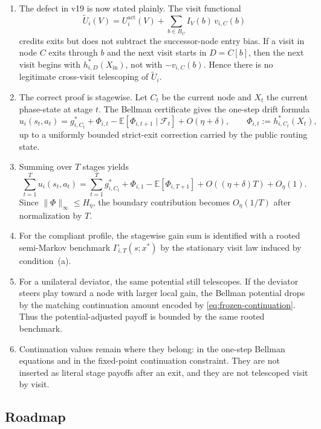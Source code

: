 \documentclass[12pt]{article}
\theoremstyle{definition}
\newcommand{\E}{\mathbb{E}}
\newcommand{\1}{\mathbf{1}}
\newcommand{\cF}{\mathcal{F}}
\begin{document}
\begin{enumerate}[label=\textnormal{(\arabic*)},leftmargin=2.4em]
\item The defect in v19 is now stated plainly. The visit functional
\[
\widetilde U_i(V)=U_i^{\mathrm{act}}(V)+\sum_{b\in B_C}I_V(b)\,v_{i,C}(b)
\]
credits exits but does not subtract the successor-node entry bias. If a visit in
node $C$ exits through $b$ and the next visit starts in $D=C[b]$, then the next
visit begins with $h_{i,D}^*(X_{\mathrm{in}})$, not with $-v_{i,C}(b)$. Hence
there is no legitimate cross-visit telescoping of $\widetilde U_i$.

\item The correct proof is stagewise. Let $C_t$ be the current node and $X_t$ the
current phase-state at stage $t$. The Bellman certificate gives the one-step
drift formula
\[
u_i(s_t,a_t)
=
g_{i,C_t}^*
+
\Phi_{i,t}
-
\E[\Phi_{i,t+1}\mid \cF_t]
+
O(\eta+\delta),
\qquad
\Phi_{i,t}:=h_{i,C_t}^*(X_t),
\]
up to a uniformly bounded strict-exit correction carried by the public routing
state.

\item Summing over $T$ stages yields
\[
\sum_{t=1}^T u_i(s_t,a_t)
=
\sum_{t=1}^T g_{i,C_t}^*
+
\Phi_{i,1}
-
\E[\Phi_{i,T+1}]
+
O\!\left((\eta+\delta)T\right)
+
O_\eta(1).
\]
Since $\|\Phi\|_\infty\le H_\eta$, the boundary contribution becomes
$O_\eta(1/T)$ after normalization by $T$.

\item For the compliant profile, the stagewise gain sum is identified with a
rooted semi-Markov benchmark $\Gamma_{i,T}(s;x^*)$ by the stationary visit law
induced by condition~\textnormal{(a)}.

\item For a unilateral deviator, the same potential still telescopes. If the
deviator steers play toward a node with larger local gain, the Bellman potential
drops by the matching continuation amount encoded by
\eqref{eq:frozen-continuation}. Thus the potential-adjusted payoff is bounded by
the same rooted benchmark.

\item Continuation values remain where they belong: in the one-step Bellman
equations and in the fixed-point continuation constraint. They are not inserted as
literal stage payoffs after an exit, and they are not telescoped visit by visit.
\end{enumerate}

\subsection{Roadmap}
\end{document}
